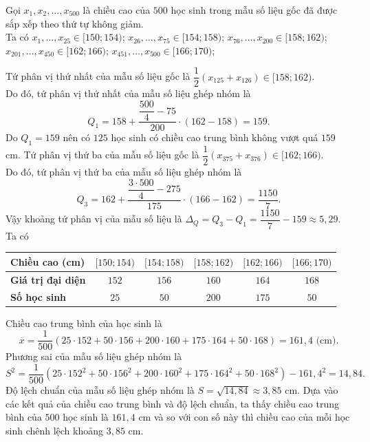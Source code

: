 \begin{ex}
{\begin{center}
\begin{tabular}{|l|c|c|c|c|c|}
		\end{tabular}
	\end{center}
	Gọi $x_1, x_2, \dots, x_{500}$ là chiều cao của $500$ học sinh trong mẫu số liệu gốc đã được sắp xếp theo thứ tự không giảm.\\
	Ta có $x_1, \dots, x_{25} \in [150; 154)$; $x_{26}, \dots, x_{75} \in [154; 158)$; $x_{76}, \dots, x_{200} \in [158; 162)$; $x_{201}, \dots, x_{450} \in [162; 166)$; $x_{451}, \dots, x_{500} \in [166; 170)$; 
	\begin{itemchoice}
		\itemch Tứ phân vị thứ nhất của mẫu số liệu gốc là $\dfrac{1}{2}(x_{125} + x_{126}) \in [158; 162)$.\\
		Do đó, tứ phân vị thứ nhất của mẫu số liệu ghép nhóm là
		$$ Q_1 = 158 + \dfrac{\dfrac{500}{4} - 75}{200} \cdot (162 - 158) = 159.$$
		Do $Q_1= 159$ nên có $125$ học sinh có chiều cao trung bình không vượt quá $159$ cm.
		\itemch Tứ phân vị thứ ba của mẫu số liệu gốc là $\dfrac{1}{2}(x_{375} + x_{376}) \in [162; 166)$.\\
		Do đó, tứ phân vị thứ ba của mẫu số liệu ghép nhóm là
		$$ Q_3 = 162 + \dfrac{\dfrac{3\cdot 500}{4} - 275}{175} \cdot (166 - 162) = \dfrac{1150}{7}.$$
		Vậy khoảng tứ phân vị của mẫu số liệu là $\Delta _Q = Q_3 - Q_1 = \dfrac{1150}{7} - 159 \approx 5{,}29$.
		\itemch Ta có
		\begin{center}
			\begin{tabular}{|l|c|c|c|c|c|}
				\hline
				\textbf{Chiều cao (cm)} & $[150; 154)$ & $ [154; 158)$ & $ [158; 162)$ & $ [162; 166)$ & $ [166; 170)$   \\
				\hline
				\textbf{Giá trị đại diện} & $152$ & $ 156 $ & $160$ & $164$ & $168$ \\
				\hline
				\textbf{Số học sinh }&$25$ & $50$ & $200$ & $175$ & $50$ \\
				\hline
			\end{tabular}
		\end{center}
		\noindent
		Chiều cao trung bình của học sinh là 
		$$\overline{x} = \dfrac{1}{500}(25\cdot 152 + 50\cdot 156 + 200\cdot 160 + 175\cdot 164 + 50\cdot 168) = 161{,}4 \text{ (cm)}.$$
		Phương sai của mẫu số liệu ghép nhóm là
		$$S^2 = \dfrac{1}{500} \left(25\cdot 152^2 + 50\cdot 156^2 + 200\cdot 160^2 + 175\cdot 164^2 + 50\cdot 168^2 \right) - 161{,}4^2 = 14{,}84. $$
		Độ lệch chuẩn của mẫu số liệu ghép nhóm là $S = \sqrt{14{,}84} \approx 3{,}85$ cm.
		\itemch Dựa vào các kết quả của chiều cao trung bình và độ lệch chuẩn, ta thấy chiều cao trung bình của $500$ học sinh là $161{,}4$ cm và so với con số này thì chiều cao của mỗi học sinh chênh lệch khoảng $3{,}85$ cm.
	\end{itemchoice}	
	}
\end{ex}

